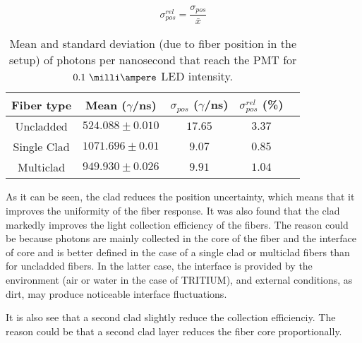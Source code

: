 \begin{equation}
\sigma^{rel}_{pos} = \frac{\sigma_{pos}}{\bar{x}}
\label{eq:RelativeStandardDesviation}
\end{equation}

\begin{table}[htbp]
\begin{center}
\begin{tabular}{|c|c|c|c|c|}
\hline
Fiber type & Mean ($\gamma$/ns) & $\sigma_{pos}$ ($\gamma$/ns) & $\sigma^{rel}_{pos}$ (\%)\\
\hline \hline \hline
Uncladded & $524.088 \pm 0.010$ & $17.65$ & $3.37$ \\ \hline
Single Clad & $1071.696 \pm 0.01$ & $9.07$ & $0.85$ \\ \hline
Multiclad & $949.930 \pm 0.026$ & $9.91$ & $1.04$ \\ \hline
\end{tabular}
\caption{Mean and standard deviation (due to fiber position in the setup) of photons per nanosecond that reach the PMT for $0.1~\milli\ampere$ LED intensity.}
\label{tab:PositionStandardDeviation}
\end{center}
\end{table}

As it can be seen, the clad reduces the position uncertainty, which means that it improves the uniformity of the fiber response. It was also found that the clad markedly improves the light collection efficiency of the fibers. The reason could be because photons are mainly collected in the core of the fiber and the interface of core and is better defined in the case of a single clad or multiclad fibers than for uncladded fibers. In the latter case, the interface is provided by the environment (air or water in the case of TRITIUM), and external conditions, as dirt, may produce noticeable interface fluctuations.

It is also see that a second clad slightly reduce the collection efficienciy. The reason could be that a second clad layer reduces the fiber core proportionally.



